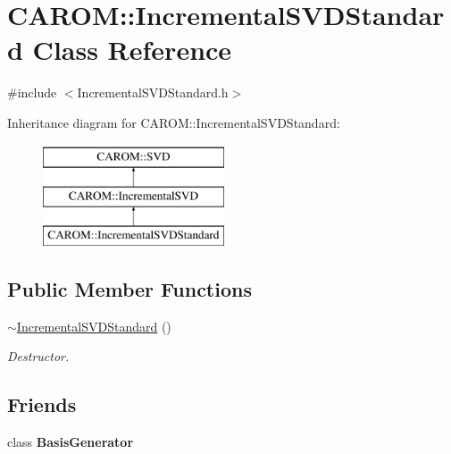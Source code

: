 \hypertarget{class_c_a_r_o_m_1_1_incremental_s_v_d_standard}{\section{C\-A\-R\-O\-M\-:\-:Incremental\-S\-V\-D\-Standard Class Reference}
\label{class_c_a_r_o_m_1_1_incremental_s_v_d_standard}
}


{\ttfamily \#include $<$Incremental\-S\-V\-D\-Standard.\-h$>$}

Inheritance diagram for C\-A\-R\-O\-M\-:\-:Incremental\-S\-V\-D\-Standard\-:\begin{figure}[H]
\begin{center}
\leavevmode
\includegraphics[height=3.000000cm]{class_c_a_r_o_m_1_1_incremental_s_v_d_standard}
\end{center}
\end{figure}
\subsection*{Public Member Functions}
\begin{DoxyCompactItemize}
\item 
\hypertarget{class_c_a_r_o_m_1_1_incremental_s_v_d_standard_a97d171ab198d738d2abb6ea92400ac7f}{\hyperlink{class_c_a_r_o_m_1_1_incremental_s_v_d_standard_a97d171ab198d738d2abb6ea92400ac7f}{$\sim$\-Incremental\-S\-V\-D\-Standard} ()}\label{class_c_a_r_o_m_1_1_incremental_s_v_d_standard_a97d171ab198d738d2abb6ea92400ac7f}

\begin{DoxyCompactList}\small\item\em Destructor. \end{DoxyCompactList}\end{DoxyCompactItemize}
\subsection*{Friends}
\begin{DoxyCompactItemize}
\item 
\hypertarget{class_c_a_r_o_m_1_1_incremental_s_v_d_standard_a14677f178902af98cccb02b0058fd326}{class {\bfseries Basis\-Generator}}\label{class_c_a_r_o_m_1_1_incremental_s_v_d_standard_a14677f178902af98cccb02b0058fd326}

\end{DoxyCompactItemize}
